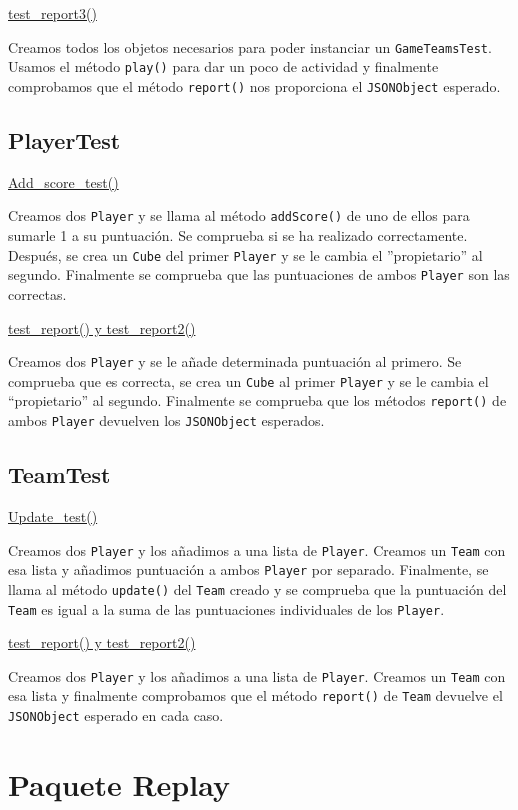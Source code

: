 \documentclass[../DocumentoOficial.tex]{subfiles}
\begin{document}
\underline{test\_report3()}

Creamos todos los objetos necesarios para poder instanciar un \texttt{GameTeamsTest}. Usamos el método \texttt{play()} para dar un poco de actividad y finalmente comprobamos que el método \texttt{report()} nos proporciona el \texttt{JSONObject} esperado.

\subsection{PlayerTest}
\underline{Add\_score\_test()}

Creamos dos \texttt{Player} y se llama al método \texttt{addScore()} de uno de ellos para sumarle 1 a su puntuación. Se comprueba si se ha realizado correctamente. Después, se crea un \texttt{Cube} del primer \texttt{Player} y se le cambia el ''propietario'' al segundo. Finalmente se comprueba que las puntuaciones de ambos \texttt{Player} son las correctas.

\underline{test\_report() y test\_report2()}

Creamos dos \texttt{Player} y se le añade determinada puntuación al primero. Se comprueba que es correcta, se crea un \texttt{Cube} al primer \texttt{Player} y se le cambia el “propietario” al segundo. Finalmente se comprueba que los métodos \texttt{report()} de ambos \texttt{Player} devuelven los \texttt{JSONObject} esperados.

\subsection{TeamTest}
\underline{Update\_test()}

Creamos dos \texttt{Player} y los añadimos a una lista de \texttt{Player}. Creamos un \texttt{Team} con esa lista y añadimos puntuación a ambos \texttt{Player} por separado. Finalmente, se llama al método \texttt{update()} del \texttt{Team} creado y se comprueba que la puntuación del \texttt{Team} es igual a la suma de las puntuaciones individuales de los \texttt{Player}.

\underline{test\_report() y test\_report2()}

Creamos dos \texttt{Player} y los añadimos a una lista de \texttt{Player}. Creamos un \texttt{Team} con esa lista y finalmente comprobamos que el método \texttt{report()} de \texttt{Team} devuelve el \texttt{JSONObject} esperado en cada caso.
\newpage

\section{Paquete Replay}
\end{document}
